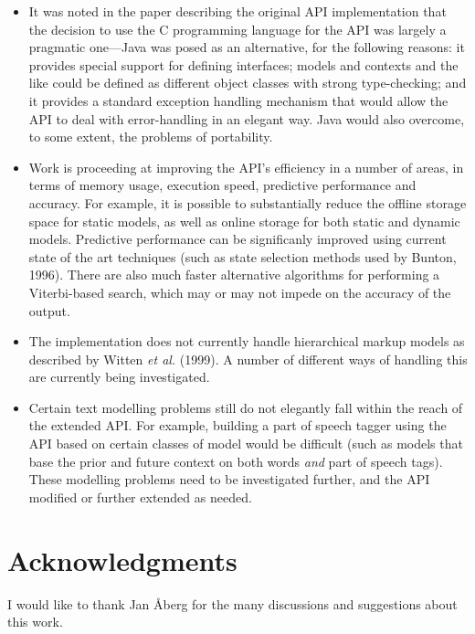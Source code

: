 \documentclass[11pt]{article}
\begin{document}
\begin{itemize}
\item It was noted in the paper describing the original API implementation that the decision
      to use the C programming language for the API was largely a pragmatic one---Java was posed 
      as an alternative, for the following reasons: it provides special support for defining interfaces; models and
      contexts and the like could be defined as different object classes with strong type-checking; and
      it provides a standard exception handling mechanism that would allow the API to deal with
      error-handling in an elegant way. Java would also overcome, to some extent, the problems of portability.

\item Work is proceeding at improving the API's efficiency in a number of areas, in terms of memory usage,
      execution speed, predictive performance and accuracy. For example, it is possible to substantially
      reduce the offline storage space for static models, as well as online storage for both static and
      dynamic models. Predictive performance can be significanly improved using current state of the
      art techniques (such as state selection methods used by Bunton, 1996). There are also much faster
      alternative algorithms for performing a Viterbi-based search, which may or may not impede on the
      accuracy of the output.

\item The implementation does not currently handle hierarchical markup models as described by
      Witten {\em et al.} (1999). A number of different ways of handling this are currently being
      investigated.

\item Certain text modelling problems still do not elegantly fall within the reach of the extended API.
      For example, building a part of speech tagger using the API based on certain classes of model would be difficult
      (such as models that base the prior and future context on both words {\em and} part of speech tags).
      These modelling problems need to be investigated further, and the API modified or further extended as needed.
\end{itemize}

\section{Acknowledgments}

I would like to thank Jan \AA berg for the many discussions
and suggestions about this work.
\end{document}
